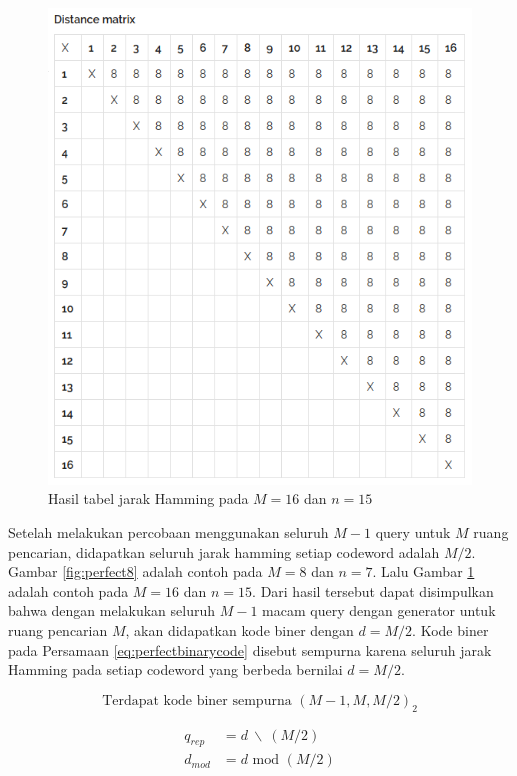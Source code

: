\begin{figure}
\centering
\includegraphics[scale=0.45]{../img/perfect16.png}
\caption{Hasil tabel jarak Hamming pada $M=16$ dan $n=15$}
\label{fig:perfect16}
\end{figure}

Setelah melakukan percobaan menggunakan seluruh $M-1$ query untuk $M$ ruang pencarian, didapatkan seluruh jarak hamming setiap codeword adalah $M/2$. Gambar \ref{fig:perfect8} adalah contoh pada $M=8$ dan $n=7$. Lalu Gambar \ref{fig:perfect16} adalah contoh pada $M=16$ dan $n=15$. Dari hasil tersebut dapat disimpulkan bahwa dengan melakukan seluruh $M-1$ macam query dengan generator untuk ruang pencarian $M$, akan didapatkan kode biner dengan $d=M/2$. Kode biner pada Persamaan \ref{eq:perfectbinarycode} disebut sempurna karena seluruh jarak Hamming pada setiap codeword yang berbeda bernilai $d = M/2$.

\begin{equation}
\label{eq:perfectbinarycode}
\text{Terdapat kode biner sempurna }(M-1, M, M/2)_2
\end{equation}

\begin{align}
q_{rep} &= d\ \backslash\ (M/2) \label{eq:qrep} \\
d_{mod} &= d \text{ mod } (M/2) \label{eq:dmod}
\end{align}

